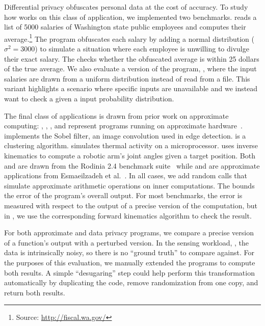 Differential privacy obfuscates personal data at the cost of
accuracy.  To study how \tool works on this class of application, we
implemented two benchmarks.
 reads a list of 5000 salaries of Washington state public
employees
and computes their average.\footnote{Source: \url{http://fiscal.wa.gov/}}
The program obfuscates each salary by adding a normal distribution ($\sigma^2
= 3000$) to simulate a situation where each employee is unwilling to divulge
their exact salary. The \passert checks whether the obfuscated average is
within 25 dollars of the true average.
We also evaluate a version of the program, , where the input
salaries are drawn from a uniform distribution instead of read from a file.
This variant highlights a scenario where specific inputs are unavailable and
we instead want to check a \passert given a input probability distribution.

The final class of applications is drawn from prior work on
approximate computing: , , , and
 represent programs
running on approximate hardware~\cite{truffle, pcmos, stochasticproc}.
 implements the Sobel filter, an image convolution used in edge
detection.
 is a clustering algorithm.
 simulates thermal activity on a microprocessor.  uses inverse kinematics to compute a robotic arm's
joint angles given a target position.
Both  and  are drawn from the Rodinia 2.4
benchmark suite~\cite{rodinia} while  and  are
approximate applications from Esmaeilzadeh et al.~\cite{npu}.
In all cases, we add random calls that
simulate approximate arithmetic operations on inner computations.
The \passert bounds the error of the program's overall output.
For most benchmarks, the error is measured with respect to the output of a
precise version of the computation, but in , we use the
corresponding forward kinematics algorithm to check the result.

For both approximate and data privacy programs, we compare a
precise version of a function's output with a perturbed version.
In the sensing workload, , the data is intrinsically noisy, so
there is no ``ground truth'' to compare against.
For the
purposes of this evaluation, we manually extended the programs to compute both
results. A simple ``desugaring'' step could help perform this transformation
automatically by duplicating the code, remove randomization from one
copy, and return both results.

